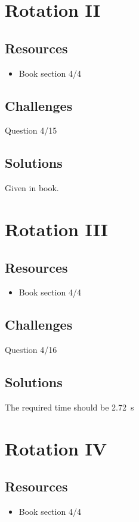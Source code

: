 \newpage
\section{Rotation II}

\subsection*{Resources}
\begin{itemize}
    \item Book section 4/4
\end{itemize}

\subsection*{Challenges}
Question 4/15

\subsection*{Solutions}
Given in book.




\newpage
\section{Rotation III}

\subsection*{Resources}
\begin{itemize}
    \item Book section 4/4
\end{itemize}

\subsection*{Challenges}
Question 4/16

\subsection*{Solutions}
The required time should be \SI{2.72}{s}




\newpage
\section{Rotation IV}

\subsection*{Resources}
\begin{itemize}
    \item Book section 4/4
\end{itemize}

